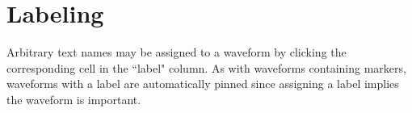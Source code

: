 \section{Labeling}

Arbitrary text names may be assigned to a waveform by clicking the corresponding cell in the ``label" column. As with
waveforms containing markers, waveforms with a label are automatically pinned since assigning a label implies the
waveform is important.

\begin{comment}

\section{Estimating Waveform Memory Usage}

When selecting a maximum depth for the history, it is important to pick a reasonable limit to avoid running out of RAM!
ngscopeclient will happily fill tens or hundreds of gigabytes of memory with deep waveforms if given a chance. Memory
usage of waveform data can be roughly estimated as 16 + sizeof(sample type) bytes per point, since each sample contains a
64-bit timestamp and duration plus the sample data.

For example, an analog sample takes 20 bytes of RAM (16 of time plus a 32-bit floating point voltage measurement) per
sample. Thus, a 1M point analog waveform takes approximately 20 MB of RAM per channel, or 80 MB per capture on a
four-channel oscilloscope with all channels enabled.

On the larger side, a 10M point four channel capture would use 800 MB and a 64M point deep-memory capture would use 5
GB. A deep history setting, such as 100 waveforms, is thus wildly inappropriate for such deep captures! A future
software release may support spilling waveform data to a temporary directory on disk, permitting effectively unlimited
history depth given sufficient disk space.

Digital waveforms use one byte per sample for the actual measurement, so 17 MB per channel for a 1M point waveform.
Most logic analyzer or MSO drivers for libscopehal will perform automatic de-duplication when a waveform goes several
clock cycles with no toggles, so the actual memory usage is likely to be significantly less than this.

Filter memory usage varies depending on the specific filter in question, however it is typically not a large
contributor to the overall ngscopeclient RAM footprint when using history mode because filters are evaluated
dynamically each time a waveform is pulled from history rather than having output cached for every historical waveform.
Thus, at most one copy of each filter's output is present in memory regardless of history depth.
\end{comment}
